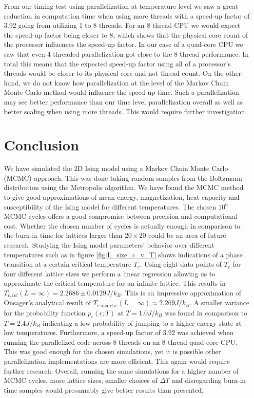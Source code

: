 \documentclass[english,notitlepage,reprint,nofootinbib]{revtex4-1}  %
\begin{document}

From our timing test using parallelization at temperature level we saw a great reduction in computation time when using more threads with a speed-up factor of 3.92 going from utilizing 1 to 8 threads. For an 8 thread CPU we would expect the speed-up factor being closer to 8, which shows that the physical core count of the processor influences the speed-up factor. In our case of a quad-core CPU we saw that even 4 threaded parallelization got close to the 8 thread performance. In total this means that the expected speed-up factor using all of a processor's threads would be closer to its physical core and not thread count. On the other hand, we do not know how parallelization at the level of the Markov Chain Monte Carlo method would influence the speed-up time. Such a parallelization may see better performance than our time level parallelization overall as well as better scaling when using more threads. This would require further investigation.


\section{Conclusion}\label{sec:conclusion}
We have simulated the 2D Ising model using a Markov Chain Monte Carlo (MCMC) approach. This was done taking random samples from the Boltzmann distribution using the Metropolis algorithm. We have found the MCMC method to give good approximations of mean energy, magnetization, heat capacity and susceptibility of the Ising model for different temperatures. The chosen $10^6$ MCMC cycles offers a good compromise between precision and computational cost. Whether the chosen number of cycles is actually enough in comparison to the burn-in time for lattices larger than $20 \times 20$ could be an area of future research.
Studying the Ising model parameters' behavior over different temperatures such as in figure \ref{fig:L_size_c_v_T} shows indications of a phase transition at a certain critical temperature $T_c$. Using eight data points of $T_c$ for four different lattice sizes we perform a linear regression allowing us to approximate the critical temperature for an infinite lattice. This results in $T_{c,tot}(L=\infty) = 2.2686 \pm 0.0129  J/k_B$. This is an impressive approximation of Onsager's analytical result of  $T_{c \text{ analytic}}(L=\infty) \approx 2.269 J/k_B$. 
A smaller variance for the probability function $p_{\epsilon}(\epsilon ; T)$ at $T=1.0J/k_B$ was found in comparison to $T=2.4J/k_B$ indicating a low probability of jumping to a higher energy state at low temperatures. 
Furthermore, a speed-up factor of $3.92$ was achieved when running the parallelized code across 8 threads on an 8 thread quad-core CPU. This was good enough for the chosen simulations, yet it is possible other parallelization implementations are more efficient. This again would require further research. Overall, running the same simulations for a higher number of MCMC cycles, more lattice sizes, smaller choices of $\Delta T$ and disregarding burn-in time samples would presumably give better results than presented.
\end{document}

